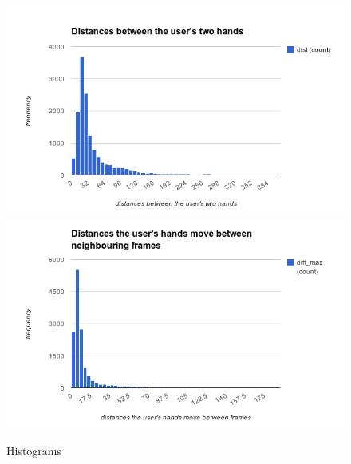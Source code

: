 %
\begin{figure}[h!]
\centering
\includegraphics[width=0.9\linewidth]{fig/histogram1.png}
\includegraphics[width=0.9\linewidth]{fig/histogram2.png}
\caption{Histograms}
\label{fig:histogram}
\end{figure}


